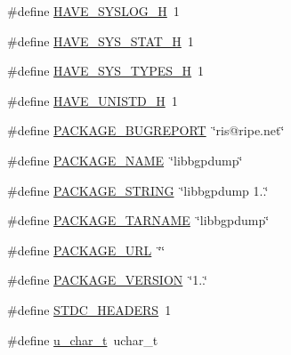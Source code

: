 \begin{DoxyCompactItemize}
\item 
\#define \hyperlink{bgpdump-config_8h_a695d4e005378df4a1f286cb3d0f4b333}{H\-A\-V\-E\-\_\-\-S\-Y\-S\-L\-O\-G\-\_\-\-H}~1
\item 
\#define \hyperlink{bgpdump-config_8h_ace156430ba007d19b4348a950d0c692b}{H\-A\-V\-E\-\_\-\-S\-Y\-S\-\_\-\-S\-T\-A\-T\-\_\-\-H}~1
\item 
\#define \hyperlink{bgpdump-config_8h_a69dc70bea5d1f8bd2be9740e974fa666}{H\-A\-V\-E\-\_\-\-S\-Y\-S\-\_\-\-T\-Y\-P\-E\-S\-\_\-\-H}~1
\item 
\#define \hyperlink{bgpdump-config_8h_a219b06937831d0da94d801ab13987639}{H\-A\-V\-E\-\_\-\-U\-N\-I\-S\-T\-D\-\_\-\-H}~1
\item 
\#define \hyperlink{bgpdump-config_8h_a1d1d2d7f8d2f95b376954d649ab03233}{P\-A\-C\-K\-A\-G\-E\-\_\-\-B\-U\-G\-R\-E\-P\-O\-R\-T}~\char`\"{}ris@ripe.\-net\char`\"{}
\item 
\#define \hyperlink{bgpdump-config_8h_a1c0439e4355794c09b64274849eb0279}{P\-A\-C\-K\-A\-G\-E\-\_\-\-N\-A\-M\-E}~\char`\"{}libbgpdump\char`\"{}
\item 
\#define \hyperlink{bgpdump-config_8h_ac73e6f903c16eca7710f92e36e1c6fbf}{P\-A\-C\-K\-A\-G\-E\-\_\-\-S\-T\-R\-I\-N\-G}~\char`\"{}libbgpdump 1..\char`\"{}
\item 
\#define \hyperlink{bgpdump-config_8h_af415af6bfede0e8d5453708afe68651c}{P\-A\-C\-K\-A\-G\-E\-\_\-\-T\-A\-R\-N\-A\-M\-E}~\char`\"{}libbgpdump\char`\"{}
\item 
\#define \hyperlink{bgpdump-config_8h_a5c93853116d5a50307b6744f147840aa}{P\-A\-C\-K\-A\-G\-E\-\_\-\-U\-R\-L}~\char`\"{}\char`\"{}
\item 
\#define \hyperlink{bgpdump-config_8h_aa326a05d5e30f9e9a4bb0b4469d5d0c0}{P\-A\-C\-K\-A\-G\-E\-\_\-\-V\-E\-R\-S\-I\-O\-N}~\char`\"{}1..\char`\"{}
\item 
\#define \hyperlink{bgpdump-config_8h_a550e5c272cc3cf3814651721167dcd23}{S\-T\-D\-C\-\_\-\-H\-E\-A\-D\-E\-R\-S}~1
\item 
\#define \hyperlink{bgpdump-config_8h_af3fe1f5d93a76350a8546310b3dbba98}{u\-\_\-char\-\_\-t}~uchar\-\_\-t
\end{DoxyCompactItemize}


